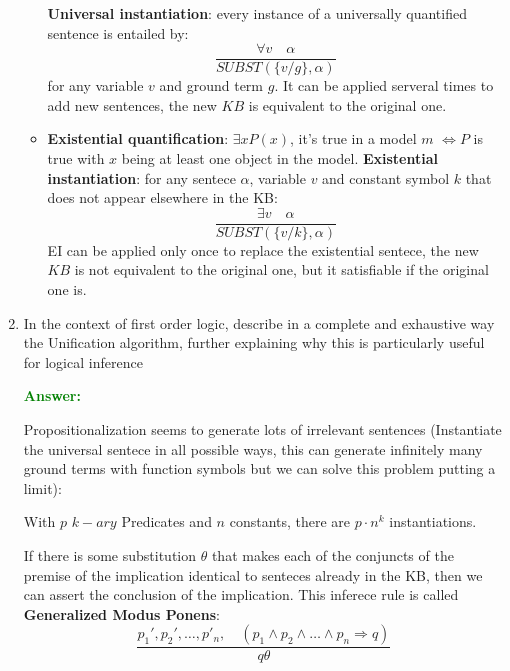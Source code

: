 \documentclass[12pt]{article}
\begin{document}
\begin{enumerate}[label=\textbf{FOL.\arabic*}]
\begin{itemize}
        \textbf{Universal instantiation}: every instance of a universally quantified sentence is entailed by: 
        \begin{equation}
            \frac{\forall v \quad \alpha}{SUBST(\{v/g\},\alpha)}
        \end{equation}
        for any variable $v$ and ground term $g$. It can be applied serveral times to add new sentences, the new $KB$ is equivalent to the original one.
        \item\textbf{Existential quantification}: $\exists x P(x)$, it's true in a model $m$ $\iff P$ is true with $x$ being 
        at least one object in the model.
        \textbf{Existential instantiation}: for any sentece $\alpha$, variable $v$ and constant symbol $k$ that does not appear elsewhere in the KB:
        \begin{equation}
            \frac{\exists v \quad \alpha}{SUBST(\{v/k\},\alpha)}
        \end{equation}
        EI can be applied only once to replace the existential sentece, the new $KB$ is not equivalent to the original one, but it satisfiable
        if the original one is.
    \end{itemize}

    \item In the context of first order logic, describe in a complete and exhaustive way the Unification algorithm, further explaining why this is particularly useful for logical inference
    
    \textcolor{green}{\textbf{Answer:}}

    Propositionalization seems to generate lots of irrelevant sentences (Instantiate the universal sentece in all possible ways, this can generate infinitely many ground terms with function symbols but we can solve this problem putting a limit):
    \begin{center}
        With $p$ $k-ary$ Predicates and $n$ constants, there are $p\cdot n^k$ instantiations.
    \end{center}

    If there is some substitution $\theta$ that makes each of the conjuncts of the premise of the implication identical 
    to senteces already in the KB, then we can assert the conclusion of the implication.
    This inferece rule is called \textbf{Generalized Modus Ponens}:
    \begin{equation}
        \frac{p_1',p_2',\ldots,p'_n,\quad (p_1\land p_2\land\ldots\land p_n \Rightarrow q)}
        {q\theta}
    \end{equation}


\end{enumerate}
\end{document}
